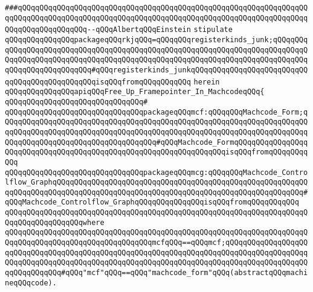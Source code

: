 \verb|###qQQqqQQqqQQqqQQqqQQqqQQqqQQqqQQqqQQqqQQqqQQqqQQqqQQqqQQqqQQqqQQqqQQqqQQqqQQqqQQqqQQqqQQqqQQqqQQqqQQqqQQqqQQqqQQqqQQqqQQqqQQqqQQqqQQqqQQqqQQqqQQqqQQqqQQqqQQq--qQQqAlbertqQQqEinstein|\newline
\newline
\newline
\newline
\newline
\newline
\verb|stipulate|\newline
\verb|qQQqqQQqqQQqqQQqpackageqQQqrkjqQQq=qQQqqQQqregisterkinds_junk;qQQqqQQqqQQqqQQqqQQqqQQqqQQqqQQqqQQqqQQqqQQqqQQqqQQqqQQqqQQqqQQqqQQqqQQqqQQqqQQqqQQqqQQqqQQqqQQqqQQqqQQqqQQqqQQqqQQqqQQqqQQqqQQqqQQqqQQqqQQqqQQqqQQqqQQqqQQqqQQqqQQqqQQq#qQQqregisterkinds_junkqQQqqQQqqQQqqQQqqQQqqQQqqQQqqQQqqQQqqQQqqQQqqQQqisqQQqfromqQQqqQQqqQQq|\newline
\verb|herein|\newline
\newline
\verb|qQQqqQQqqQQqqQQqapiqQQqFree_Up_Framepointer_In_MachcodeqQQq{|\newline
\verb|qQQqqQQqqQQqqQQqqQQqqQQqqQQqqQQq#|\newline
\verb|qQQqqQQqqQQqqQQqqQQqqQQqqQQqqQQqpackageqQQqmcf:qQQqqQQqMachcode_Form;qQQqqQQqqQQqqQQqqQQqqQQqqQQqqQQqqQQqqQQqqQQqqQQqqQQqqQQqqQQqqQQqqQQqqQQqqQQqqQQqqQQqqQQqqQQqqQQqqQQqqQQqqQQqqQQqqQQqqQQqqQQqqQQqqQQqqQQqqQQqqQQqqQQqqQQqqQQqqQQqqQQqqQQqqQQqqQQq#qQQqMachcode_FormqQQqqQQqqQQqqQQqqQQqqQQqqQQqqQQqqQQqqQQqqQQqqQQqqQQqqQQqqQQqqQQqqQQqisqQQqfromqQQqqQQqqQQq|\newline
\newline
\verb|qQQqqQQqqQQqqQQqqQQqqQQqqQQqqQQqpackageqQQqmcg:qQQqqQQqMachcode_Controlflow_GraphqQQqqQQqqQQqqQQqqQQqqQQqqQQqqQQqqQQqqQQqqQQqqQQqqQQqqQQqqQQqqQQqqQQqqQQqqQQqqQQqqQQqqQQqqQQqqQQqqQQqqQQqqQQqqQQqqQQqqQQqqQQqqQQq#qQQqMachcode_Controlflow_GraphqQQqqQQqqQQqqQQqisqQQqfromqQQqqQQqqQQq|\newline
\verb|qQQqqQQqqQQqqQQqqQQqqQQqqQQqqQQqqQQqqQQqqQQqqQQqqQQqqQQqqQQqqQQqqQQqqQQqqQQqqQQqqQQqqQQqwhere|\newline
\verb|qQQqqQQqqQQqqQQqqQQqqQQqqQQqqQQqqQQqqQQqqQQqqQQqqQQqqQQqqQQqqQQqqQQqqQQqqQQqqQQqqQQqqQQqqQQqqQQqqQQqqQQqmcfqQQq==qQQqmcf;qQQqqQQqqQQqqQQqqQQqqQQqqQQqqQQqqQQqqQQqqQQqqQQqqQQqqQQqqQQqqQQqqQQqqQQqqQQqqQQqqQQqqQQqqQQqqQQqqQQqqQQqqQQqqQQqqQQqqQQqqQQqqQQqqQQqqQQqqQQqqQQqqQQqqQQqqQQqqQQqqQQqqQQqqQQq#qQQq"mcf"qQQq==qQQq"machcode_form"qQQq(abstractqQQqmachineqQQqcode).|\newline

